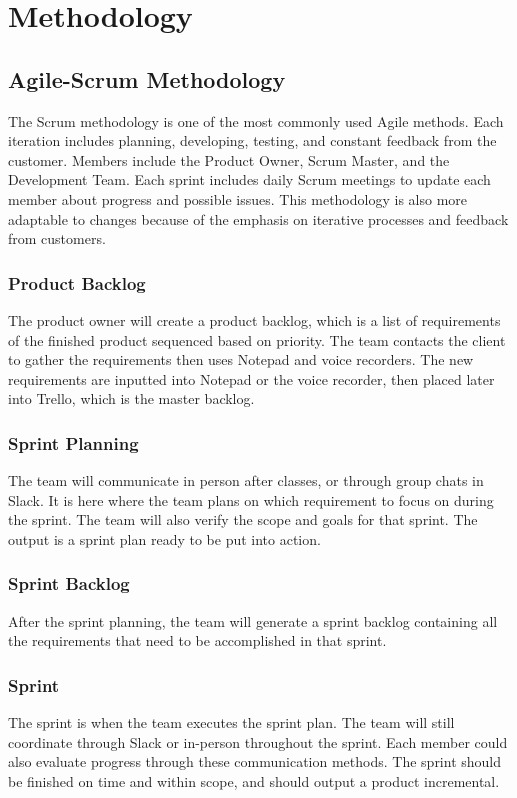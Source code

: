 \chapter{Methodology}

\section{Agile-Scrum Methodology}
The Scrum methodology is one of the most commonly used Agile methods. Each iteration includes planning, developing, testing, and constant feedback from the customer. Members include the Product Owner, Scrum Master, and the Development Team. Each sprint includes daily Scrum meetings to update each member about progress and possible issues. This methodology is also more adaptable to changes because of the emphasis on iterative processes and feedback from customers.

\subsection{Product Backlog}
The product owner will create a product backlog, which is a list of requirements of the finished product sequenced based on priority. The team contacts the client to gather the requirements then uses Notepad and voice recorders. The new requirements are inputted into Notepad or the voice recorder, then placed later into Trello, which is the master backlog.

\subsection{Sprint Planning}
The team will communicate in person after classes, or through group chats in Slack. It is here where the team plans on which requirement to focus on during the sprint. The team will also verify the scope and goals for that sprint. The output is a sprint plan ready to be put into action.

\subsection{Sprint Backlog}
After the sprint planning, the team will generate a sprint backlog containing all the requirements that need to be accomplished in that sprint.

\subsection{Sprint}
The sprint is when the team executes the sprint plan. The team will still coordinate through Slack or in-person throughout the sprint. Each member could also evaluate progress through these communication methods. The sprint should be finished on time and within scope, and should output a product incremental.

